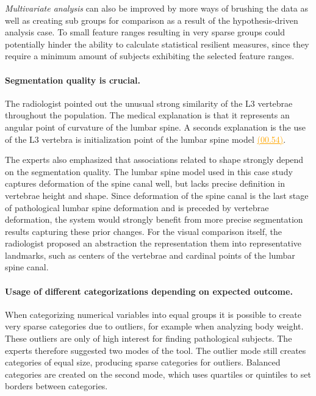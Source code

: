 \documentclass[journal]{style/vgtc} 			          %
\newcommand{\com}[1]{\textcolor{orange}{\uline{#1}}}
\begin{document}
\emph{Multivariate analysis} can also be improved by more ways of brushing the data as well as creating sub groups for comparison as a result of the hypothesis-driven analysis case.
%
To small feature ranges resulting in very sparse groups could potentially hinder the ability to calculate statistical resilient measures, since they require a minimum amount of subjects exhibiting the selected feature ranges.
%

\paragraph{Segmentation quality is crucial.}
The radiologist pointed out the unusual strong similarity of the L3 vertebrae throughout the population.
%
The medical explanation is that it represents an angular point of curvature of the lumbar spine.
%
A seconds explanation is the use of the L3 vertebra is initialization point of the lumbar spine model \com{(00.54)}.

The experts also emphasized that associations related to shape strongly depend on the segmentation quality.
%
The lumbar spine model used in this case study captures deformation of the spine canal well, but lacks precise definition in vertebrae height and shape.
%
Since deformation of the spine canal is the last stage of pathological lumbar spine deformation and is preceded by vertebrae deformation, the system would strongly benefit from more precise segmentation results capturing these prior changes.
%
For the visual comparison itself, the radiologist proposed an abstraction the representation them into representative landmarks, such as centers of the vertebrae and cardinal points of the lumbar spine canal.

\paragraph{Usage of different categorizations depending on expected outcome.}
When categorizing numerical variables into equal groups it is possible to create very sparse categories due to outliers, for example when analyzing body weight.
%
These outliers are only of high interest for finding pathological subjects. %
%
The experts therefore suggested two modes of the tool.
%
The outlier mode still creates categories of equal size, producing sparse categories for outliers.
%
Balanced categories are created on the second mode, which uses quartiles or quintiles to set borders between categories.
\end{document}
